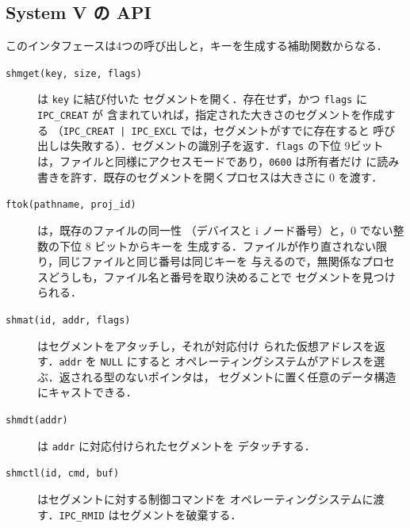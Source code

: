 \documentclass[../main.tex]{subfiles}
\begin{document}
\subsection{System V の API}

このインタフェースは4つの呼び出しと，キーを生成する補助関数からなる．
\begin{description}
  \item[\texttt{shmget(key, size, flags)}] は \texttt{key} に結び付いた
    セグメントを開く．存在せず，かつ \texttt{flags} に \texttt{IPC\_CREAT} が
    含まれていれば，指定された大きさのセグメントを作成する
    （\texttt{IPC\_CREAT | IPC\_EXCL} では，セグメントがすでに存在すると
    呼び出しは失敗する）．セグメントの識別子を返す．\texttt{flags} の下位
    9ビットは，ファイルと同様にアクセスモードであり，\texttt{0600} は所有者だけ
    に読み書きを許す．既存のセグメントを開くプロセスは大きさに 0 を渡す．
  \item[\texttt{ftok(pathname, proj\_id)}] は，既存のファイルの同一性
    （デバイスと i ノード番号）と，0 でない整数の下位 8 ビットからキーを
    生成する．ファイルが作り直されない限り，同じファイルと同じ番号は同じキーを
    与えるので，無関係なプロセスどうしも，ファイル名と番号を取り決めることで
    セグメントを見つけられる．
  \item[\texttt{shmat(id, addr, flags)}] はセグメントをアタッチし，それが対応付け
    られた仮想アドレスを返す．\texttt{addr} を \texttt{NULL} にすると
    オペレーティングシステムがアドレスを選ぶ．返される型のないポインタは，
    セグメントに置く任意のデータ構造にキャストできる．
  \item[\texttt{shmdt(addr)}] は \texttt{addr} に対応付けられたセグメントを
    デタッチする．
  \item[\texttt{shmctl(id, cmd, buf)}] はセグメントに対する制御コマンドを
    オペレーティングシステムに渡す．\texttt{IPC\_RMID} はセグメントを破棄する．
\end{description}
\end{document}
